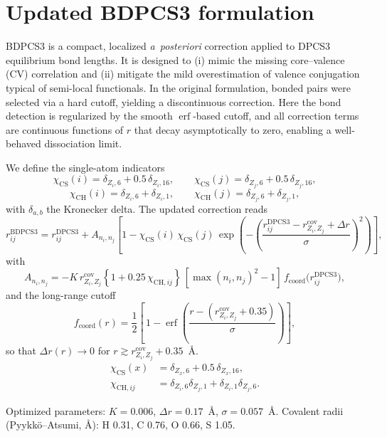 \documentclass[a4paper]{article}
\DeclareMathOperator{\erf}{erf}
\newcommand{\dZi}[1]{\delta_{Z_i,#1}}
\newcommand{\dZj}[1]{\delta_{Z_j,#1}}
\begin{document}
\section{Updated BDPCS3 formulation}
BDPCS3 is a compact, localized \emph{a~posteriori} correction applied to DPCS3 equilibrium bond lengths. It is designed to (i) mimic the missing core--valence (CV) correlation and (ii) mitigate the mild overestimation of valence conjugation typical of semi-local functionals.
In the original formulation, bonded pairs were selected via a hard cutoff, yielding a discontinuous correction. Here the bond detection is regularized by the smooth $\erf$-based cutoff, and all correction terms are continuous functions of $r$ that decay asymptotically to zero, enabling a well-behaved dissociation limit.

We define the single-atom indicators
\[
\chi_{\mathrm{CS}}(i)=\dZi{6}+0.5\,\dZi{16},\qquad
\chi_{\mathrm{CS}}(j)=\dZj{6}+0.5\,\dZj{16},
\]
\[
\chi_{\mathrm{CH}}(i)=\dZi{6}+\dZi{1},\qquad
\chi_{\mathrm{CH}}(j)=\dZj{6}+\dZj{1},
\]
with \(\delta_{a,b}\) the Kronecker delta. The updated correction reads
\begin{equation}
  r_{ij}^{\mathrm{BDPCS3}} 
  = r_{ij}^{\mathrm{DPCS3}} 
  + A_{n_i,n_j}\!
    \left[
      1 - \chi_{\mathrm{CS}}(i)\,\chi_{\mathrm{CS}}(j)\,
      \exp\!\left(
        -\left(\frac{ r_{ij}^{\mathrm{DPCS3}} - r_{Z_i,Z_j}^{\mathrm{cov}} + \Delta r }{ \sigma }\right)^{\!2}
      \right)
    \right],
\end{equation}
with
\begin{equation}
  A_{n_i,n_j} 
  = -K\,r_{Z_i,Z_j}^{\mathrm{cov}}
    \left\{1 + 0.25\,\chi_{\mathrm{CH},ij}\right\}
    \,[\max(n_i,n_j)^2-1]\,
    f_{\mathrm{coord}}\!\bigl(r_{ij}^{\mathrm{DPCS3}}\bigr),
\end{equation}
and the long-range cutoff
\begin{equation}
  f_{\mathrm{coord}}(r) =
  \frac{1}{2}\left[\,1 - \erf\!\left(\frac{r-(r_{Z_i,Z_j}^{\mathrm{cov}}+0.35)}{\sigma}\right)\right],
\end{equation}
so that \(\Delta r(r)\!\to\!0\) for \(r\gtrsim r_{Z_i,Z_j}^{\mathrm{cov}}+0.35\)~\AA.
\begin{align}
  \chi_{\mathrm{CS}}(x)&=\delta_{Z_x,6}+0.5\,\delta_{Z_x,16},\\
  \chi_{\mathrm{CH},ij}&=\delta_{Z_i,6}\delta_{Z_j,1}+\delta_{Z_i,1}\delta_{Z_j,6}.
\end{align}

Optimized parameters: \(K=0.006\), \(\Delta r=0.17\)~\AA, \(\sigma=0.057\)~\AA.  
Covalent radii (Pyykk\"o--Atsumi, \AA): H 0.31, C 0.76, O 0.66, S 1.05.
\end{document}
